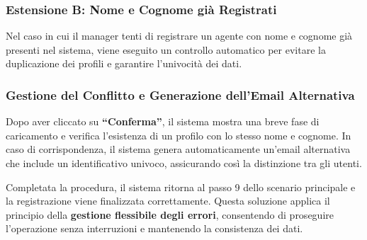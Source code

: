 \subsubsection{Estensione B: Nome e Cognome già Registrati}

Nel caso in cui il manager tenti di registrare un agente con nome e cognome già presenti nel sistema, viene eseguito un controllo automatico per evitare la duplicazione dei profili e garantire l’univocità dei dati.

\subsubsection{Gestione del Conflitto e Generazione dell’Email Alternativa}
Dopo aver cliccato su \textbf{“Conferma”}, il sistema mostra una breve fase di caricamento e verifica l’esistenza di un profilo con lo stesso nome e cognome.
In caso di corrispondenza, il sistema genera automaticamente un’email alternativa che include un identificativo univoco, assicurando così la distinzione tra gli utenti.

Completata la procedura, il sistema ritorna al passo 9 dello scenario principale e la registrazione viene finalizzata correttamente.
Questa soluzione applica il principio della \textbf{gestione flessibile degli errori}, consentendo di proseguire l’operazione senza interruzioni e mantenendo la consistenza dei dati.



